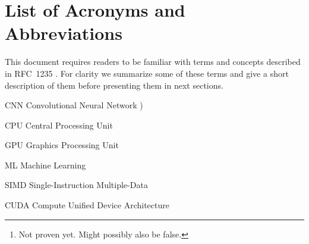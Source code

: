 \documentclass[12pt,twoside]{article}
\begin{document}
\maketitle


\begin{abstract}
\label{sec:abstract}

We compare 4 dynamic memory allocators designed for running on GPUs and select the best performing under TensorFlow’s Convolutional Neural Network (CNN) benchmark, running only the \texttt{ResNet-50} model. Our main metric of comparison is the number of images per second processed by the benchmark. Other metrics studied are: object sizes requested for allocation by the benchmark and the frequency in allocation request and in the sizes used. After our performance analysis, we conclude that \texttt{Halloc} algorithm is better than the already used algorithms by TensorFlow, \texttt{CUDAMalloc} and \texttt{BFCMalloc}, in the context of the benchmark itself.\footnote{Not proven yet. Might possibly also be false.}.

\textbf{Keywords:} Algorithm, Performance, Machine learning, GPU, Dynamic memory, Allocation, TensorFlow

\end{abstract}

\tableofcontents

\section*{List of Acronyms and Abbreviations}
\label{list-of-acronyms-and-abbreviations}

This document requires readers to be familiar with terms and concepts described in \mbox{RFC~1235} \cite{john_ioannidis_coherent_1991}. For clarity we summarize some of these terms and give a short description of them before presenting them in next sections.

\begin{basedescript}{\desclabelstyle{\pushlabel}\desclabelwidth{10em}}
\item[CNN]					Convolutional Neural Network \cite{postel_internet_1981})
\item[CPU]                  Central Processing Unit
\item[GPU]                  Graphics Processing Unit
\item[ML]                   Machine Learning
\item[SIMD]                 Single-Instruction Multiple-Data
\item[CUDA]                 Compute Unified Device Architecture
\end{basedescript}
\end{document}
